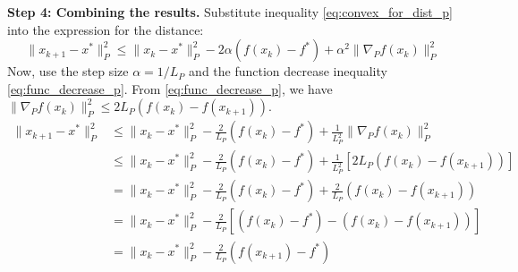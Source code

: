 \documentclass{article}
\newcommand{\normp}[1]{\|#1\|_P}       %
\newcommand{\gradp}{\nabla_P}
\begin{document}
\textbf{Step 4: Combining the results.}
Substitute inequality \eqref{eq:convex_for_dist_p} into the expression for the distance:
\begin{equation*}
    \normp{x_{k+1} - x^*}^2 \le \normp{x_k - x^*}^2 - 2 \alpha (f(x_k) - f^*) + \alpha^2 \normp{\gradp f(x_k)}^2
\end{equation*}
Now, use the step size $\alpha = 1/L_P$ and the function decrease inequality \eqref{eq:func_decrease_p}. From \eqref{eq:func_decrease_p}, we have $\normp{\gradp f(x_k)}^2 \le 2 L_P (f(x_k) - f(x_{k+1}))$.
\begin{align*}
    \normp{x_{k+1} - x^*}^2 &\le \normp{x_k - x^*}^2 - \frac{2}{L_P} (f(x_k) - f^*) + \frac{1}{L_P^2} \normp{\gradp f(x_k)}^2 \\
    &\le \normp{x_k - x^*}^2 - \frac{2}{L_P} (f(x_k) - f^*) + \frac{1}{L_P^2} [2 L_P (f(x_k) - f(x_{k+1}))] \\
    &= \normp{x_k - x^*}^2 - \frac{2}{L_P} (f(x_k) - f^*) + \frac{2}{L_P} (f(x_k) - f(x_{k+1})) \\
    &= \normp{x_k - x^*}^2 - \frac{2}{L_P} \left[ (f(x_k) - f^*) - (f(x_k) - f(x_{k+1})) \right] \\
    &= \normp{x_k - x^*}^2 - \frac{2}{L_P} (f(x_{k+1}) - f^*)
\end{align*}
\end{document}
